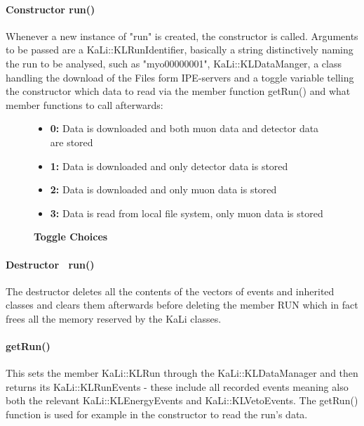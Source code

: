     \paragraph{Constructor run()}
    \label{ch:Analysis software:sec:methods of the class run:subsec:Constructor}
    Whenever a new instance of "run" is created, the constructor is called. Arguments to be passed are a KaLi::KLRunIdentifier, basically a string distinctively naming the run to be analysed, such as "myo00000001", KaLi::KLDataManger, a class handling the download of the Files form IPE-servers and a toggle variable telling the constructor which data to read via the member function getRun() and what member functions to call afterwards:
    \begin{figure}
    \caption*{\bf Toggle Choices}
    	\begin{itemize}
    		\item {\bf 0:} Data is downloaded and both muon data and detector data are stored
    		\item {\bf 1:} Data is downloaded and only detector data is stored
    		\item {\bf 2:} Data is downloaded and only muon data is stored
    		\item {\bf 3:} Data is read from local file system, only muon data is stored
    	\end{itemize}
    \end{figure}
    
    \paragraph{Destructor ~run()}
    \label{ch:Analysis software:sec:methods of the class run:subsec:destructor}
    The destructor deletes all the contents of the vectors of events and inherited classes and clears them afterwards before deleting the member RUN which in fact frees all the memory reserved by the KaLi classes.
    
    \paragraph{getRun()}
    \label{ch:Analysis software:sec:methods of the class run:subsec:getRun()}
    
    This sets the member KaLi::KLRun through the KaLi::KLDataManager and then returns its KaLi::KLRunEvents - these include all recorded events meaning also both the relevant KaLi::KLEnergyEvents and KaLi::KLVetoEvents. The getRun() function is used for example in the constructor to read the run's data.
    
